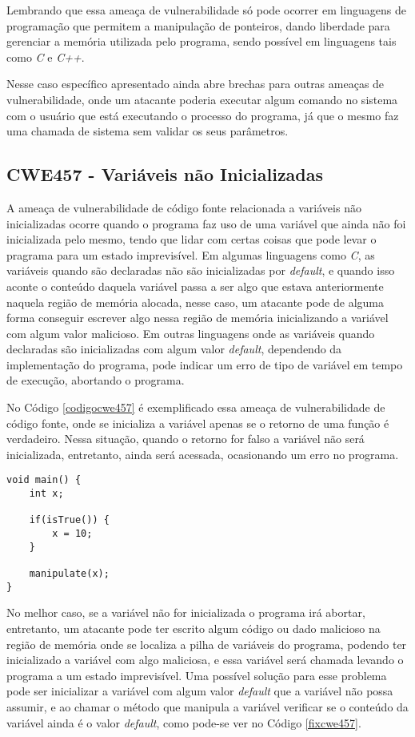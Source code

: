 Lembrando que essa ameaça de vulnerabilidade só pode ocorrer em linguagens de
programação que permitem a manipulação de ponteiros, dando liberdade para
gerenciar a memória utilizada pelo programa, sendo possível em linguagens tais
como \textit{C} e \textit{C++}.

Nesse caso específico apresentado ainda abre brechas para outras ameaças de
vulnerabilidade, onde um atacante poderia executar algum comando no sistema com
o usuário que está executando o processo do programa, já que o mesmo faz uma
chamada de sistema sem validar os seus parâmetros.

\subsection{CWE457 - Variáveis não Inicializadas}\label{cwe457}

A ameaça de vulnerabilidade de código fonte relacionada a variáveis não
inicializadas ocorre quando o programa faz uso de uma variável que ainda não foi
inicializada pelo mesmo, tendo que lidar com certas coisas que pode levar o
pragrama para um estado imprevisível. Em algumas linguagens como \textit{C}, as
variáveis quando são declaradas não são inicializadas por \textit{default}, e
quando isso aconte o conteúdo daquela variável passa a ser algo que estava
anteriormente naquela região de memória alocada, nesse caso, um atacante pode de
alguma forma conseguir escrever algo nessa região de memória inicializando a
variável com algum valor malicioso. Em outras linguagens onde as variáveis
quando declaradas são inicializadas com algum valor \textit{default}, dependendo
da implementação do programa, pode indicar um erro de tipo de variável em tempo
de execução, abortando o programa.

No Código \ref{codigocwe457} é exemplificado essa ameaça de vulnerabilidade de
código fonte, onde se inicializa a variável apenas se o retorno de uma função é
verdadeiro. Nessa situação, quando o retorno for falso a variável não será
inicializada, entretanto, ainda será acessada, ocasionando um erro no programa.

\begin{lstlisting}[caption={Código exemplo CWE457}, label=codigocwe457]
void main() {
    int x;

    if(isTrue()) {
        x = 10;
    }

    manipulate(x);   
}
\end{lstlisting}

No melhor caso, se a variável não for inicializada o programa irá abortar,
entretanto, um atacante pode ter escrito algum código ou dado malicioso na
região de memória onde se localiza a pilha de variáveis do programa, podendo ter
inicializado a variável com algo maliciosa, e essa variável será chamada
levando o programa a um estado imprevisível. Uma possível solução para esse
problema pode ser inicializar a variável com algum valor \textit{default} que a
variável não possa assumir, e ao chamar o método que manipula a variável
verificar se o conteúdo da variável ainda é o valor \textit{default}, como
pode-se ver no Código \ref{fixcwe457}.

